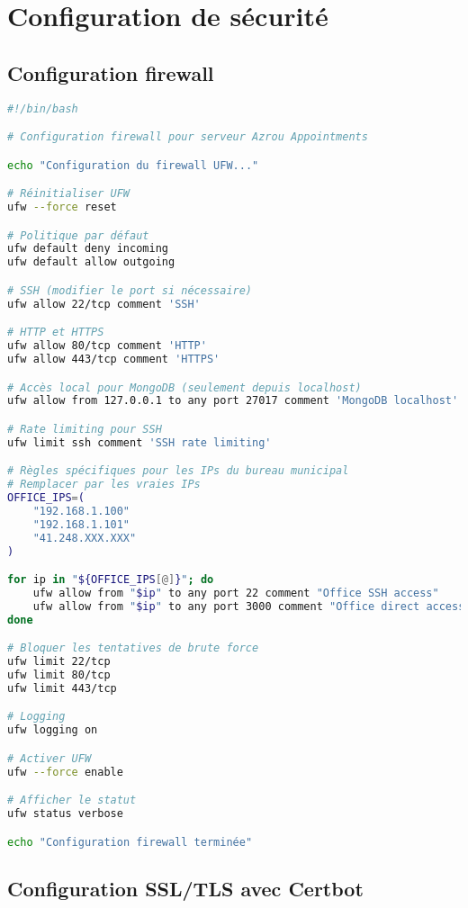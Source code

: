 \section{Configuration de sécurité}

\subsection{Configuration firewall}

\begin{lstlisting}[language=bash, caption=firewall-setup.sh - Configuration firewall UFW]
#!/bin/bash

# Configuration firewall pour serveur Azrou Appointments

echo "Configuration du firewall UFW..."

# Réinitialiser UFW
ufw --force reset

# Politique par défaut
ufw default deny incoming
ufw default allow outgoing

# SSH (modifier le port si nécessaire)
ufw allow 22/tcp comment 'SSH'

# HTTP et HTTPS
ufw allow 80/tcp comment 'HTTP'
ufw allow 443/tcp comment 'HTTPS'

# Accès local pour MongoDB (seulement depuis localhost)
ufw allow from 127.0.0.1 to any port 27017 comment 'MongoDB localhost'

# Rate limiting pour SSH
ufw limit ssh comment 'SSH rate limiting'

# Règles spécifiques pour les IPs du bureau municipal
# Remplacer par les vraies IPs
OFFICE_IPS=(
    "192.168.1.100"
    "192.168.1.101"
    "41.248.XXX.XXX"
)

for ip in "${OFFICE_IPS[@]}"; do
    ufw allow from "$ip" to any port 22 comment "Office SSH access"
    ufw allow from "$ip" to any port 3000 comment "Office direct access"
done

# Bloquer les tentatives de brute force
ufw limit 22/tcp
ufw limit 80/tcp
ufw limit 443/tcp

# Logging
ufw logging on

# Activer UFW
ufw --force enable

# Afficher le statut
ufw status verbose

echo "Configuration firewall terminée"
\end{lstlisting}

\subsection{Configuration SSL/TLS avec Certbot}

